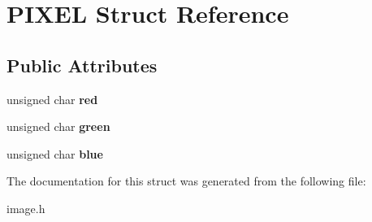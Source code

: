 \hypertarget{structPIXEL}{}\section{P\+I\+X\+EL Struct Reference}
\label{structPIXEL}
\subsection*{Public Attributes}
\begin{DoxyCompactItemize}
\item 
\mbox{\label{structPIXEL_a17bc4c45a1352bd3b17a1531c7447777}} 
unsigned char {\bfseries red}
\item 
\mbox{\label{structPIXEL_a33766b745b260fb5d24bb56953d19bca}} 
unsigned char {\bfseries green}
\item 
\mbox{\label{structPIXEL_a76cf1ee41fdebff7873b728b93c9c338}} 
unsigned char {\bfseries blue}
\end{DoxyCompactItemize}


The documentation for this struct was generated from the following file\+:\begin{DoxyCompactItemize}
\item 
image.\+h\end{DoxyCompactItemize}
